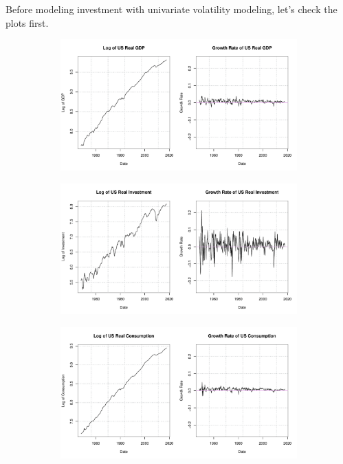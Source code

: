 \documentclass[12pt]{article}
\theoremstyle{definition}
\numberwithin{equation}{section}
\numberwithin{figure}{section}
\numberwithin{table}{section}
\begin{document}
Before modeling investment with univariate volatility modeling, let's check the plots first.
\begin{figure}[H]
  \centering
  \begin{subfigure}[b]{0.85\textwidth}
    \centering
    \includegraphics[width=\textwidth]{../Figures/usrealgdp}
  \end{subfigure}
  \begin{subfigure}[b]{0.85\textwidth}
    \centering
    \includegraphics[width=\textwidth]{../Figures/usInv}
  \end{subfigure}
  \begin{subfigure}[b]{0.85\textwidth}
    \centering
    \includegraphics[width=\textwidth]{../Figures/usCons}
  \end{subfigure}
\end{figure}
\end{document}
